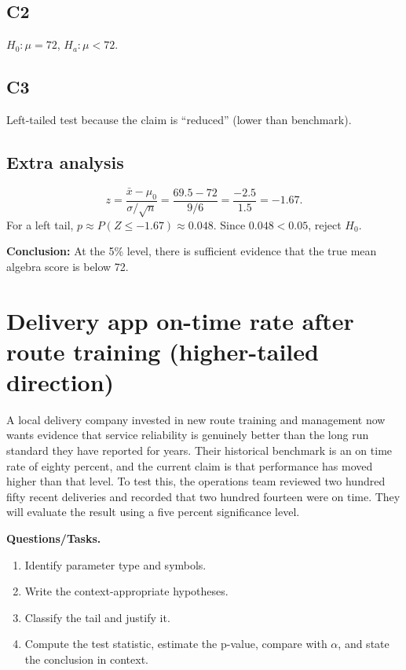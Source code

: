 \subsection*{C2}
\(H_0:\mu=72\), \(H_a:\mu<72\).

\subsection*{C3}
Left-tailed test because the claim is ``reduced'' (lower than benchmark). \LeftTailGraph

\subsection*{Extra analysis}
\[
z=\frac{\bar{x}-\mu_0}{\sigma/\sqrt{n}}=\frac{69.5-72}{9/6}=\frac{-2.5}{1.5}=-1.67.
\]
For a left tail, \(p\approx P(Z\le -1.67)\approx 0.048\). Since \(0.048<0.05\), reject \(H_0\).

\textbf{Conclusion:} At the 5\% level, there is sufficient evidence that the true mean algebra score is below 72.


\section{Delivery app on-time rate after route training (higher-tailed direction)}
A local delivery company invested in new route training and management now wants evidence that service reliability is genuinely better than the long run standard they have reported for years. Their historical benchmark is an on time rate of eighty percent, and the current claim is that performance has moved higher than that level. To test this, the operations team reviewed two hundred fifty recent deliveries and recorded that two hundred fourteen were on time. They will evaluate the result using a five percent significance level.

\textbf{Questions/Tasks.}
\begin{enumerate}
    \item[(C1)] Identify parameter type and symbols.
    \item[(C2)] Write the context-appropriate hypotheses.
    \item[(C3)] Classify the tail and justify it.
    \item[(Extra analysis)] Compute the test statistic, estimate the p-value, compare with \(\alpha\), and state the conclusion in context.
\end{enumerate}

